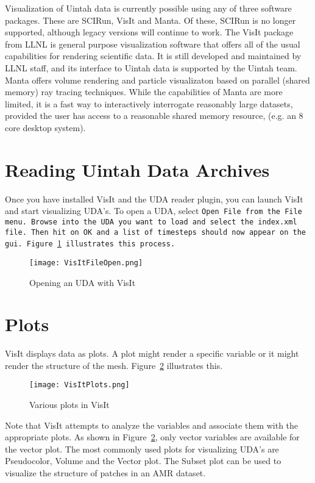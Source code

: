 Visualization of Uintah data is currently possible using any of three
software packages.  These are SCIRun, VisIt and Manta.  Of these, SCIRun is
no longer supported, although legacy versions will continue to work.  The
VisIt package from LLNL is general purpose visualization software that offers
all of the usual capabilities for rendering scientific data.  It is still
developed and maintained by LLNL staff, and its interface to Uintah data is
supported by the Uintah team.  Manta offers volume rendering and particle
visualizaton based on parallel (shared memory) ray tracing techniques.
While the capabilities of Manta are more limited, it is a fast way to
interactively interrogate reasonably large datasets, provided the user has
access to a reasonable shared memory resource, (e.g. an 8 core desktop system).


\section{Reading Uintah Data Archives}

Once you have installed VisIt and the UDA reader plugin, you can launch VisIt and start visualizing UDA's. To open a UDA, select \tt Open File \normalfont from the \tt  File \normalfont menu. Browse into the UDA you want to load and select the \tt index.xml \normalfont file. Then hit on \tt OK \normalfont and a list of timesteps should now appear on the gui. Figure~\ref{VisItFileOpen} illustrates this process.

\begin{figure}
  \center
  \texttt{[image: VisItFileOpen.png]}
  \caption{Opening an UDA with VisIt}
  \label{VisItFileOpen}
\end{figure}

\section{Plots}

VisIt displays data as plots. A plot might render a specific variable or it might render the structure of the mesh. Figure~\ref{VisItPlots} illustrates this.

\begin{figure}
  \center
  \texttt{[image: VisItPlots.png]}
  \caption{Various plots in VisIt}
  \label{VisItPlots}
\end{figure}

Note that VisIt attempts to analyze the variables and associate them with the appropriate plots. As shown in Figure~\ref{VisItPlots}, only vector variables are available for the vector plot. The most commonly used plots for visualizing UDA's are Pseudocolor, Volume and the Vector plot. The Subset plot can be used to visualize the structure of patches in an AMR dataset. %


